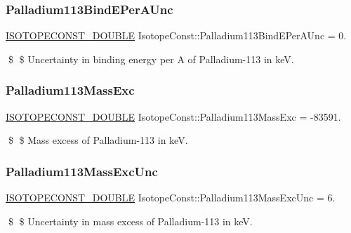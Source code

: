\subsubsection{\texorpdfstring{Palladium113\+Bind\+E\+Per\+A\+Unc}{Palladium113BindEPerAUnc}}
{\footnotesize\ttfamily \mbox{\hyperlink{group___isotope_const-_macros_ga8f45a7272ce02c0b4c65c44636ed719a}{I\+S\+O\+T\+O\+P\+E\+C\+O\+N\+S\+T\+\_\+\+D\+O\+U\+B\+LE}} Isotope\+Const\+::\+Palladium113\+Bind\+E\+Per\+A\+Unc = 0.}

\$ \$ Uncertainty in binding energy per A of Palladium-\/113 in keV. \mbox{\label{group___isotope_const-_palladium-_pd113_gaa65122bfe95d60383913145338d7be80}} 
\subsubsection{\texorpdfstring{Palladium113\+Mass\+Exc}{Palladium113MassExc}}
{\footnotesize\ttfamily \mbox{\hyperlink{group___isotope_const-_macros_ga8f45a7272ce02c0b4c65c44636ed719a}{I\+S\+O\+T\+O\+P\+E\+C\+O\+N\+S\+T\+\_\+\+D\+O\+U\+B\+LE}} Isotope\+Const\+::\+Palladium113\+Mass\+Exc = -\/83591.}

\$ \$ Mass excess of Palladium-\/113 in keV. \mbox{\label{group___isotope_const-_palladium-_pd113_ga767afe5cdb598159783255fa499ccb3e}} 
\subsubsection{\texorpdfstring{Palladium113\+Mass\+Exc\+Unc}{Palladium113MassExcUnc}}
{\footnotesize\ttfamily \mbox{\hyperlink{group___isotope_const-_macros_ga8f45a7272ce02c0b4c65c44636ed719a}{I\+S\+O\+T\+O\+P\+E\+C\+O\+N\+S\+T\+\_\+\+D\+O\+U\+B\+LE}} Isotope\+Const\+::\+Palladium113\+Mass\+Exc\+Unc = 6.}

\$ \$ Uncertainty in mass excess of Palladium-\/113 in keV. \mbox{\label{group___isotope_const-_palladium-_pd113_gaff7f0de4d63138ceab4d08e4b09f7ea0}} 
